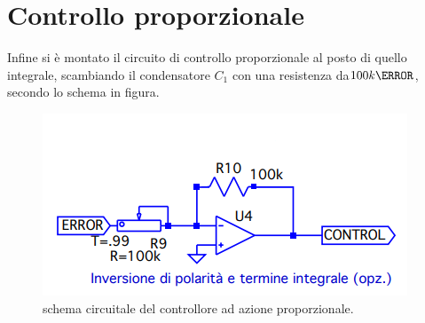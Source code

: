 \documentclass[10pt, a4paper, italian]{article}
\begin{document}
\section{Controllo proporzionale}
Infine si è montato il circuito di controllo proporzionale al posto di quello integrale, scambiando il condensatore $C_1$ con una resistenza da$100 k\ohm$, secondo lo schema in figura.
\begin{figure}[H]
    \centering
	\includegraphics[scale=0.7]{controlgenprop}
    \caption{schema circuitale del controllore ad azione proporzionale.
    \label{fig: Draft1}}
\end{figure}
\end{document}
